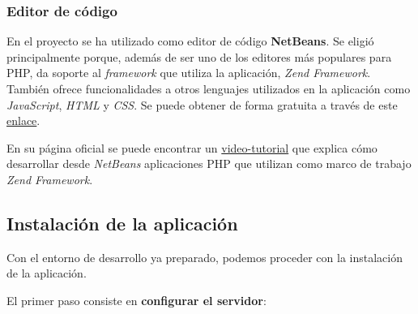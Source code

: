 \subsubsection{Editor de código}

En el proyecto se ha utilizado como editor de código \textbf{NetBeans}.
Se eligió principalmente porque, además de ser uno de los editores más
populares para PHP, da soporte al \emph{framework} que utiliza la
aplicación, \emph{Zend Framework}. También ofrece funcionalidades a
otros lenguajes utilizados en la aplicación como \emph{JavaScript},
\emph{HTML} y \emph{CSS}. Se puede obtener de forma gratuita a través de
este
\href{https://netbeans.org/community/releases/82/install.html}{enlace}.

En su página oficial se puede encontrar un
\href{https://netbeans.org/kb/docs/php/zend-framework-screencast.html}{video-tutorial}
que explica cómo desarrollar desde \emph{NetBeans} aplicaciones PHP que
utilizan como marco de trabajo \emph{Zend Framework}.

\subsection{Instalación de la aplicación}

Con el entorno de desarrollo ya preparado, podemos proceder con la
instalación de la aplicación.

El primer paso consiste en \textbf{configurar el servidor}:

